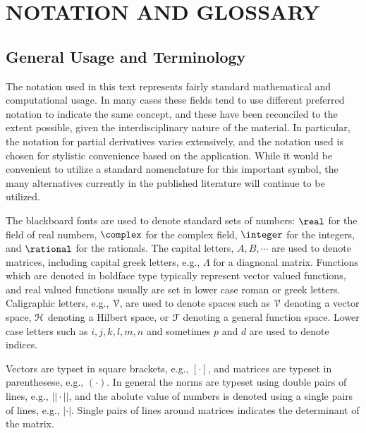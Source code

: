\setcounter{chapter}{0}

\chapter*{NOTATION AND GLOSSARY}
\section*{General Usage and Terminology}
\thispagestyle{plain}
The notation used in this text represents fairly standard mathematical
and computational usage. In many cases these fields tend to use
different preferred notation to indicate the same concept, and these
have been reconciled to the extent possible,
given the interdisciplinary nature of the material.
In particular, the notation for partial
derivatives varies extensively, and the notation used is chosen
for stylistic convenience based on the application. While it would be
convenient to utilize a standard nomenclature for this important
symbol, the many alternatives currently in the published literature
will continue to be utilized.



The blackboard fonts are used to denote standard
sets of numbers: $\real$ for the field of real numbers,
$\complex$ for the complex field, $\integer$ for the integers,
and $\rational$ for the rationals.
The capital letters, $A, B, \cdots $ are used to denote matrices,
including capital greek letters, e.g., $\Lambda$ for a diagnonal matrix.
Functions which are denoted in boldface type typically represent 
vector valued functions, and real valued functions usually are set in
lower case roman or greek letters.
Caligraphic letters, e.g., $\cal V$, are used to denote spaces such
as $\cal V$ denoting a vector space, $\cal H$ denoting a Hilbert space,
or $\cal F$ denoting a general function space.
Lower case letters such as $i, j, k, l, m, n$ and sometimes $p$  and $d$
are used to denote indices.

Vectors are typset in square brackets, e.g., $[ \cdot ]$, and matrices are
typeset in parenthesese, e.g., $( \cdot)$. 
In general the norms are typeset using double pairs of
lines, e.g., $|| \cdot ||$,
and the abolute value of numbers is denoted using a single pairs of lines,
e.g., $| \cdot |$.
Single pairs of lines around matrices indicates the determinant of the
matrix.


\glossfont



